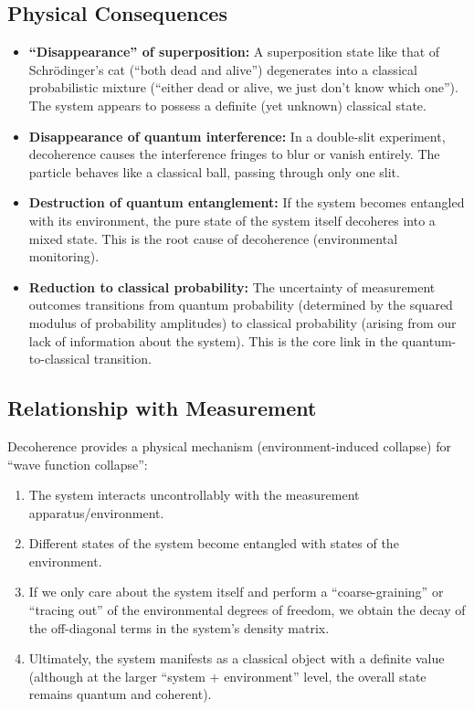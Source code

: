 \subsection{Physical Consequences}
\begin{itemize}
	\item \textbf{``Disappearance'' of superposition:} A superposition state like that of Schr\"odinger's cat (``both dead and alive'') degenerates into a classical probabilistic mixture (``either dead or alive, we just don't know which one''). The system appears to possess a definite (yet unknown) classical state.
	\item \textbf{Disappearance of quantum interference:} In a double-slit experiment, decoherence causes the interference fringes to blur or vanish entirely. The particle behaves like a classical ball, passing through only one slit.
	\item \textbf{Destruction of quantum entanglement:} If the system becomes entangled with its environment, the pure state of the system itself decoheres into a mixed state. This is the root cause of decoherence (environmental monitoring).
	\item \textbf{Reduction to classical probability:} The uncertainty of measurement outcomes transitions from quantum probability (determined by the squared modulus of probability amplitudes) to classical probability (arising from our lack of information about the system). This is the core link in the quantum-to-classical transition.
\end{itemize}

\subsection{Relationship with Measurement}

Decoherence provides a physical mechanism (environment-induced collapse) for ``wave function collapse'':
\begin{enumerate}
	\item The system interacts uncontrollably with the measurement apparatus/environment.
	\item Different states of the system become entangled with states of the environment.
	\item If we only care about the system itself and perform a ``coarse-graining'' or ``tracing out'' of the environmental degrees of freedom, we obtain the decay of the off-diagonal terms in the system's density matrix.
	\item Ultimately, the system manifests as a classical object with a definite value (although at the larger ``system + environment'' level, the overall state remains quantum and coherent).
\end{enumerate}

